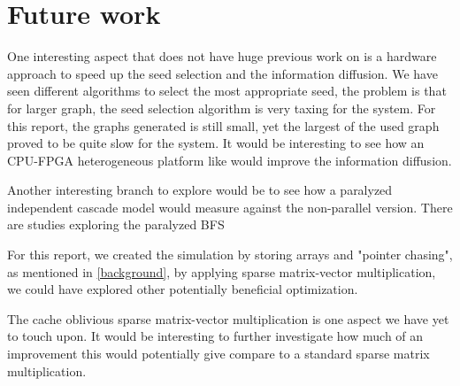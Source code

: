 \chapter{Future work}
One interesting aspect that does not have huge previous work on is a hardware approach to speed up the seed selection and the information diffusion. We have seen different algorithms to select the most appropriate seed, the problem is that for larger graph, the seed selection algorithm is very taxing for the system. For this report, the graphs generated is still small, yet the largest of the used graph proved to be quite slow for the system. It would be interesting to see how an CPU-FPGA heterogeneous platform like \cite{HybridBFS2015} would improve the information diffusion. 

Another interesting branch to explore would be to see how a paralyzed independent cascade model would measure against the non-parallel version. There are studies exploring the paralyzed BFS\cite{ParallelBFS2011}

For this report, we created the simulation by storing arrays and "pointer chasing", as mentioned in \ref{background}, by applying sparse matrix-vector multiplication, we could have explored other potentially beneficial optimization. 

The cache oblivious sparse matrix-vector multiplication is one aspect we have yet to touch upon. It would be interesting to further investigate how much of an improvement this would potentially give compare to a standard sparse matrix multiplication.